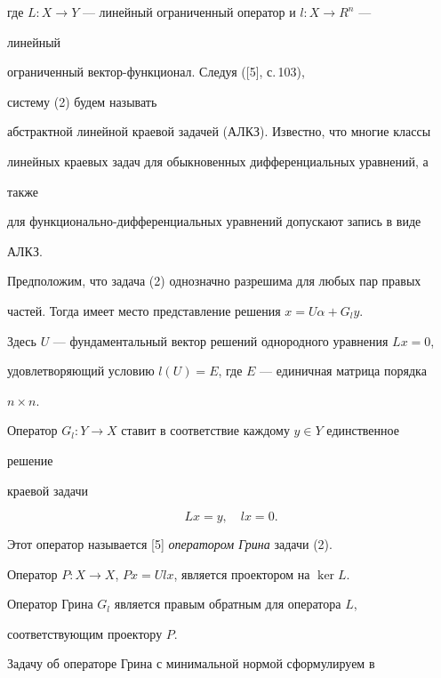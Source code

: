 где $L:X\to Y$ --- линейный ограниченный оператор и $l:X\to R^n$ --- 


линейный 


ограниченный вектор-функционал. Следуя ([5], с.\,103), 


систему (2) будем называть 


абстрактной линейной краевой задачей (АЛКЗ). Известно, что многие классы  


линейных краевых задач для обыкновенных дифференциальных уравнений, а 


также  


для функционально-дифференциальных уравнений допускают запись в виде 


АЛКЗ. 


 


Предположим, что задача (2) однозначно разрешима для любых пар правых  


частей. Тогда имеет место представление решения $x=U\alpha+G_l y$. 


Здесь $U$ --- фундаментальный вектор решений однородного уравнения $L 


x=0$,  


удовлетворяющий условию $l(U)=E$, где $E$ --- единичная матрица порядка 


$n\times n$.  


Оператор $G_l:Y\to X$ ставит в соответствие каждому $y\in Y$ единственное 


решение 


краевой задачи 


$$ 


L x=y,\quad l x=0. 


$$ 


Этот оператор называется [5] {\it оператором Грина} задачи (2). 


 


\begin{lem} 


Оператор $P:X\to X$, $P x=U l x$, является проектором на $\ker L$.  


Оператор Грина $G_l$ является правым обратным для оператора $L$, 


соответствующим проектору $P$. 


\end{lem} 


 


Задачу об операторе Грина с минимальной нормой сформулируем в  


